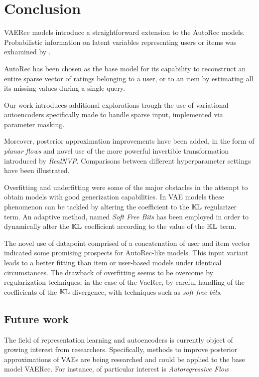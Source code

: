 \chapter{Conclusion}

VAERec models introduce a straightforward extension to the AutoRec models.
Probabilistic information on latent variables representing
users or items was exhamined by \cite{vanBaalen2016}.

AutoRec has been chosen as the base model 
for its capability to reconstruct an entire sparse
vector of ratings
belonging to a user, or to an item by estimating all its missing values during 
a single query. 

Our work introduces additional explorations trough the use of variational autoencoders
specifically made to handle sparse input, implemented via parameter masking.

Moreover, posterior approximation improvements have been
added, in the form of \emph{planar flows}\cite{1505.05770} and novel use of 
the more powerful invertible transformation introduced by \emph{RealNVP}\cite{RealNVP}.
Comparisons between different hyperparameter settings have been illustrated.

Overfitting and underfitting were some of the major obstacles in the attempt to 
obtain models with good generization capabilities. In VAE models
these phenomenon can be tackled by altering the coefficient to the $\mathbb{KL}$
regularizer term. An adaptive method, named \emph{Soft Free Bits} \cite{1611.02731}
has been employed in order to dynamically alter the $\mathbb{KL}$ coefficient according to
the value of the $\mathbb{KL}$ term.

The novel use of datapoint comprised of a concatenation of user and item vector indicated
some promising prospects for AutoRec-like models. This input variant
leads to a better fitting than item or user-based models under identical circumstances.
The drawback of overfitting seems to be overcome by 
regularization techniques, in the case of the VaeRec, by careful handling of the
coefficients of the $\mathbb{KL}$ divergence, with techniques such as \emph{soft free bits}.

\section{Future work}

The field of representation learning and autoencoders is currently object of
growing interest from researchers. Specifically, methods to improve posterior
approximations of VAEs are being researched and could be applied to the base model
VAERec. For instance, of particular interest is \emph{Autoregressive Flow}
\cite{autoregressive_flow}

